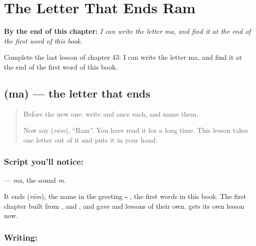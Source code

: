 
\chapter{The Letter That Ends Ram}
\label{ch:mw-letter-ends-ram}

\begin{chapteropening}
\textbf{By the end of this chapter:} \emph{I can write the letter ma, and find it at the end of the first word of this book.}

Complete the last lesson of chapter 43: I can write the letter ma, and find it at the end of the first word of this book.
\end{chapteropening}

\section[\texorpdfstring{\mw{म} (ma)}{म (ma)}]{ (ma) — the letter that ends }

\label{lesson:MW-W43-ma}



\begin{quote}
Before the new one: write  and  once each, and name them.

Now say \textbf{} (\emph{rām}), \textquotedblleft{}Ram\textquotedblright{}. You have read it for a long time. This lesson takes one letter out of it and puts it in your hand.
\end{quote}

\subsection*{Script you'll notice: }
\textbf{} — \emph{ma}, the sound \emph{m}.

It ends \textbf{} (\emph{rām}), the name in the greeting \textbf{- }, the first words in this book. The first chapter built \textbf{} from \textbf{}, \textbf{} and \textbf{}, and gave \textbf{} and \textbf{} lessons of their own. \textbf{} gets its own lesson now.

\subsection*{Writing: }

